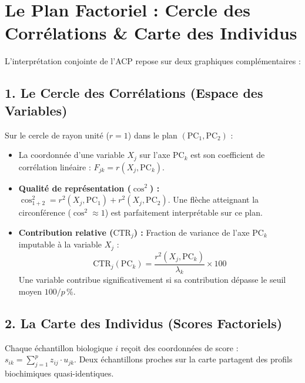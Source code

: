 \documentclass[11pt,a4paper]{article}
\begin{document}
\section{Le Plan Factoriel : Cercle des Corrélations \& Carte des Individus}

L'interprétation conjointe de l'ACP repose sur deux graphiques complémentaires :

\subsection{1. Le Cercle des Corrélations (Espace des Variables)}
Sur le cercle de rayon unité ($r = 1$) dans le plan $(\text{PC}_1, \text{PC}_2)$ :
\begin{itemize}[leftmargin=*, label=\faAngleRight]
  \item La coordonnée d'une variable $X_j$ sur l'axe $\text{PC}_k$ est son coefficient de corrélation linéaire : $F_{jk} = r(X_j, \text{PC}_k)$.
  \item \textbf{Qualité de représentation ($\cos^2$) :} $\cos^2_{1+2} = r^2(X_j, \text{PC}_1) + r^2(X_j, \text{PC}_2)$. Une flèche atteignant la circonférence ($\cos^2 \approx 1$) est parfaitement interprétable sur ce plan.
  \item \textbf{Contribution relative ($\text{CTR}_j$) :} Fraction de variance de l'axe $\text{PC}_k$ imputable à la variable $X_j$ :
  \begin{equation*}
    \text{CTR}_j(\text{PC}_k) = \frac{r^2(X_j, \text{PC}_k)}{\lambda_k} \times 100
  \end{equation*}
  Une variable contribue significativement si sa contribution dépasse le seuil moyen $100/p\,\%$.
\end{itemize}

\subsection{2. La Carte des Individus (Scores Factoriels)}
Chaque échantillon biologique $i$ reçoit des coordonnées de score : $s_{ik} = \sum_{j=1}^p z_{ij} \cdot u_{jk}$.
Deux échantillons proches sur la carte partagent des profils biochimiques quasi-identiques.
\end{document}
